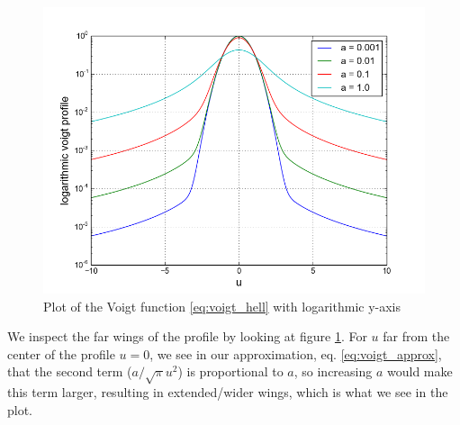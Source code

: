 \documentclass{article}
\begin{document}
\begin{figure}[H]
  \centering
  \includegraphics[scale=0.5]{ssa_voigt_ylog.png}
  \caption{Plot of the Voigt function \eqref{eq:voigt_hell} with logarithmic y-axis}
  \label{fig:voigt_ylog}
\end{figure}
We inspect the far wings of the profile by looking at figure \ref{fig:voigt_ylog}. For $u$ far from the center of the profile $u=0$, we see in our approximation, eq. \eqref{eq:voigt_approx}, that the second term ($a/\sqrt{\pi}u^2$) is proportional to $a$, so increasing $a$ would make this term larger, resulting in extended/wider wings, which is what we see in the plot.
\end{document}
